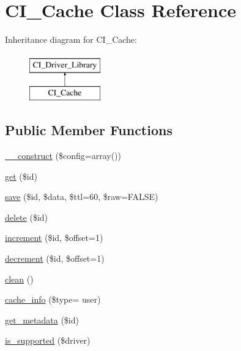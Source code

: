 \hypertarget{class_c_i___cache}{}\section{C\+I\+\_\+\+Cache Class Reference}
\label{class_c_i___cache}
Inheritance diagram for C\+I\+\_\+\+Cache\+:\begin{figure}[H]
\begin{center}
\leavevmode
\includegraphics[height=2.000000cm]{class_c_i___cache}
\end{center}
\end{figure}
\subsection*{Public Member Functions}
\begin{DoxyCompactItemize}
\item 
\hyperlink{class_c_i___cache_af7f9493844d2d66e924e3c1df51ce616}{\+\_\+\+\_\+construct} (\$config=array())
\item 
\hyperlink{class_c_i___cache_a50e3bfb586b2f42932a6a93f3fbb0828}{get} (\$id)
\item 
\hyperlink{class_c_i___cache_a472645db04a8ce4b040b789a3062a7d2}{save} (\$id, \$data, \$ttl=60, \$raw=F\+A\+L\+S\+E)
\item 
\hyperlink{class_c_i___cache_a2f8258add505482d7f00ea26493a5723}{delete} (\$id)
\item 
\hyperlink{class_c_i___cache_a2f07a4e09b57f4460d49852497d1808f}{increment} (\$id, \$offset=1)
\item 
\hyperlink{class_c_i___cache_a4eb1c2772c8efc48c411ea060dd040b7}{decrement} (\$id, \$offset=1)
\item 
\hyperlink{class_c_i___cache_adb40b812890a8bc058bf6b7a0e1a54d9}{clean} ()
\item 
\hyperlink{class_c_i___cache_ac0fc0f9f3f8834ecae4af292bb4e9bc5}{cache\+\_\+info} (\$type= \textquotesingle{}user\textquotesingle{})
\item 
\hyperlink{class_c_i___cache_a59635cf18e997c5141bffa05ff7622e0}{get\+\_\+metadata} (\$id)
\item 
\hyperlink{class_c_i___cache_a6901d466745bfdfe4dc772fa012c99eb}{is\+\_\+supported} (\$driver)
\end{DoxyCompactItemize}
